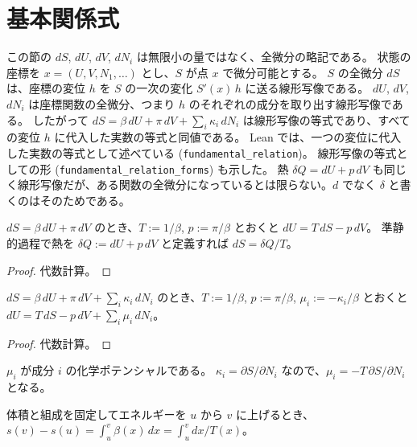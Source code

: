 \section{基本関係式}
\label{sec:fundamental}

この節の $dS$, $dU$, $dV$, $dN_i$ は無限小の量ではなく、全微分の略記である。
状態の座標を $x = (U, V, N_1, \dots)$ とし、$S$ が点 $x$ で微分可能とする。
$S$ の全微分 $dS$ は、座標の変位 $h$ を $S$ の一次の変化 $S'(x)\, h$ に送る線形写像である。
$dU$, $dV$, $dN_i$ は座標関数の全微分、つまり $h$ のそれぞれの成分を取り出す線形写像である。
したがって $dS = \beta\, dU + \pi\, dV + \sum_i \kappa_i\, dN_i$ は線形写像の等式であり、すべての変位 $h$ に代入した実数の等式と同値である。
Lean では、一つの変位に代入した実数の等式として述べている (\texttt{fundamental\_relation})。
線形写像の等式としての形 (\texttt{fundamental\_relation\_forms}) も示した。
熱 $\delta Q = dU + p\, dV$ も同じく線形写像だが、ある関数の全微分になっているとは限らない。$d$ でなく $\delta$ と書くのはそのためである。

\begin{theorem}
  \label{thm:clausius}
  \leanok
  $dS = \beta\, dU + \pi\, dV$ のとき、$T := 1/\beta$, $p := \pi/\beta$ とおくと $dU = T\, dS - p\, dV$。
  準静的過程で熱を $\delta Q := dU + p\, dV$ と定義すれば $dS = \delta Q / T$。
\end{theorem}

\begin{proof}
  \leanok
  代数計算。
\end{proof}

\begin{theorem}[多成分系の基本関係式]
  \label{thm:fundamental-multi}
  \leanok
  $dS = \beta\, dU + \pi\, dV + \sum_i \kappa_i\, dN_i$ のとき、$T := 1/\beta$, $p := \pi/\beta$, $\mu_i := -\kappa_i/\beta$ とおくと $dU = T\, dS - p\, dV + \sum_i \mu_i\, dN_i$。
\end{theorem}

\begin{proof}
  \leanok
  代数計算。
\end{proof}

$\mu_i$ が成分 $i$ の化学ポテンシャルである。
$\kappa_i = \partial S/\partial N_i$ なので、$\mu_i = -T\, \partial S/\partial N_i$ となる。

\begin{theorem}[熱量測定によるエントロピー差]
  \label{thm:calorimetry}
  \leanok
  体積と組成を固定してエネルギーを $u$ から $v$ に上げるとき、$s(v) - s(u) = \int_u^v \beta(x)\, dx = \int_u^v dx / T(x)$。
\end{theorem}

